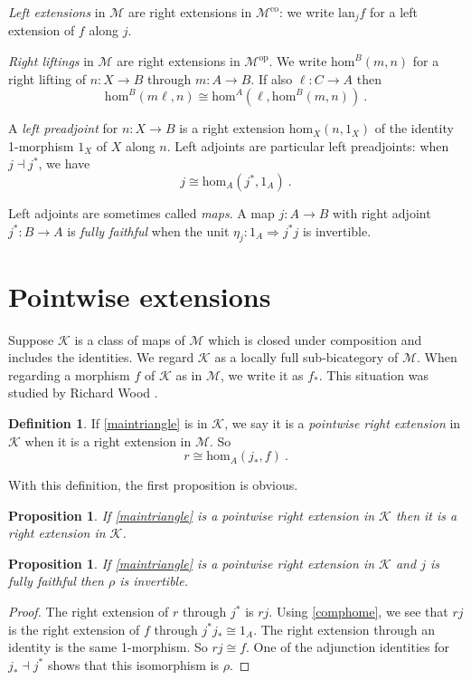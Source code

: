 \documentclass[a4paper,12pt]{article}
\newtheorem{proposition}[theorem]{Proposition}
\theoremstyle{definition}
\newtheorem*{Definition}{Definition}%
\theoremstyle{fact}
\theoremstyle{genquest}
\theoremstyle{step}
\newcommand{\lra}{\longrightarrow}
\newcommand{\Lra}{\Longrightarrow}
\def\CK{{\mathscr K}}
\def\CM{{\mathscr M}}
\begin{document}
{{\em Left extensions} in $\CM$ are right extensions in $\CM^{\mathrm{co}}$:
we write $\mathrm{lan}_jf$ for a left extension of $f$ along $j$. 

{\em Right liftings} in $\CM$ are right extensions in $\CM^{\mathrm{op}}$.
We write $\mathrm{hom}^B (m,n)$ for a right lifting of $n:X\lra B$ through $m : A\lra B$.
If also $\ell : C \lra A$ then
\begin{equation}\label{comphoml}
\mathrm{hom}^B (m\ell,n) \cong \mathrm{hom}^A (\ell , \mathrm{hom}^B (m,n)) \ .
\end{equation}

A {\em left preadjoint} for $n : X\lra B$ is a right extension $\mathrm{hom}_X (n,1_X)$ of 
the identity 1-morphism $1_X$ of $X$ along $n$. Left adjoints are particular left preadjoints:
when $j\dashv j^*$, we have
$$j \cong \mathrm{hom}_A (j^*,1_A) \ .$$

Left adjoints are sometimes called {\em maps}.
A map $j:A\lra B$ with right adjoint $j^*:B\lra A$ is {\em fully faithful} when the unit 
$\eta_j : 1_A\Lra j^*j$ is invertible. 

\section{Pointwise extensions}\label{Ple}

Suppose $\CK$ is a class of maps of $\CM$ which is closed under composition and includes the identities.
We regard $\CK$ as a locally full sub-bicategory of $\CM$. 
When regarding a morphism $f$ of $\CK$ as in $\CM$, we write it as $f_*$. 
This situation was studied by Richard Wood \cite{WoodPAI, WoodPAII}.

\begin{Definition}
If \eqref{maintriangle} is in $\CK$, we say it is a {\em pointwise right extension}
in $\CK$ when it is a right extension in $\CM$. So 
\begin{equation}
r \cong \mathrm{hom}_A (j_*,f) \ .
\end{equation}   
\end{Definition}

With this definition, the first proposition is obvious.

\begin{proposition}
If \eqref{maintriangle} is a pointwise right extension in $\CK$ then it is a right extension in $\CK$.  
\end{proposition}

\begin{proposition}
If \eqref{maintriangle} is a pointwise right extension in $\CK$ and $j$ is 
fully faithful then $\rho$ is invertible.  
\end{proposition}
\begin{proof}
The right extension of $r$ through $j^*$ is $rj$. 
Using \eqref{comphome}, we see that $rj$ is the right extension of $f$ through $j^*j_*\cong 1_A$.
The right extension through an identity is the same 1-morphism.
So $rj\cong f$. One of the adjunction identities for $j_*\dashv j^*$ shows that this isomorphism is $\rho$.
\end{proof}

}
\end{document}
